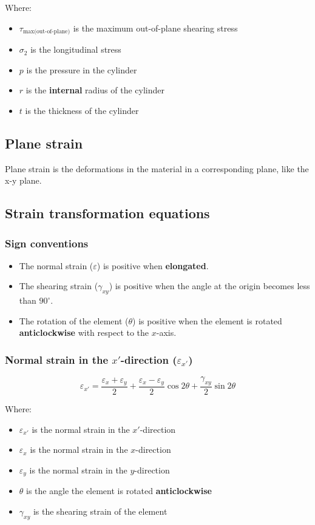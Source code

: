\documentclass[11pt]{article}
\begin{document}
Where:
\begin{itemize}
\item \(\tau_{\text{max(out-of-plane)}}\) is the maximum out-of-plane shearing stress
\item \(\sigma_2\) is the longitudinal stress
\item \(p\) is the pressure in the cylinder
\item \(r\) is the \textbf{internal} radius of the cylinder
\item \(t\) is the thickness of the cylinder
\end{itemize}

\subsection{Plane strain}
\label{sec:orgb6548f6}
Plane strain is the deformations in the material in a corresponding plane, like the x-y plane.

\subsection{Strain transformation equations}
\label{sec:orgd06c42c}

\subsubsection{Sign conventions}
\label{sec:org7c30642}
\begin{itemize}
\item The normal strain (\(\varepsilon\)) is positive when \textbf{elongated}.
\item The shearing strain (\(\gamma_{xy}\)) is positive when the angle at the origin becomes less than \(90^{\circ}\).
\item The rotation of the element (\(\theta\)) is positive when the element is rotated \textbf{anticlockwise} with respect to the \(x\)-axis.
\end{itemize}

\subsubsection{Normal strain in the \(x'\)-direction (\(\varepsilon_{x'}\))}
\label{sec:org98587ab}
\[\varepsilon_{x'} = \frac{\varepsilon_x + \varepsilon_y}{2} + \frac{\varepsilon_x - \varepsilon_y}{2} \cos 2 \theta + \frac{\gamma_{xy}}{2} \sin 2 \theta\]

Where:
\begin{itemize}
\item \(\varepsilon_{x'}\) is the normal strain in the \(x'\)-direction
\item \(\varepsilon_{x}\) is the normal strain in the \(x\)-direction
\item \(\varepsilon_{y}\) is the normal strain in the \(y\)-direction
\item \(\theta\) is the angle the element is rotated \textbf{anticlockwise}
\item \(\gamma_{xy}\) is the shearing strain of the element
\end{itemize}
\end{document}
